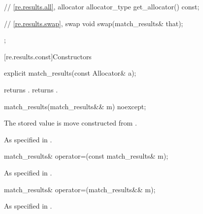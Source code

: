 \begin{codeblock}
{{      // \ref{re.results.all}, allocator
      allocator_type get_allocator() const;

      // \ref{re.results.swap}, swap
      void swap(match_results& that);
    };
}
\end{codeblock}

[re.results.const]{Constructors}

%
\begin{itemdecl}
explicit match_results(const Allocator& a);
\end{itemdecl}

\begin{itemdescr}
\pnum
\ensures
{} returns .
 returns .
\end{itemdescr}

%
\begin{itemdecl}
match_results(match_results&& m) noexcept;
\end{itemdecl}

\begin{itemdescr}
\pnum
\effects
The stored  value is move constructed from .

\pnum
\ensures
As specified in .
\end{itemdescr}

%
\begin{itemdecl}
match_results& operator=(const match_results& m);
\end{itemdecl}

\begin{itemdescr}
\pnum
\ensures
As specified in .
\end{itemdescr}

%
\begin{itemdecl}
match_results& operator=(match_results&& m);
\end{itemdecl}

\begin{itemdescr}
\pnum
\ensures
As specified in .
\end{itemdescr}

